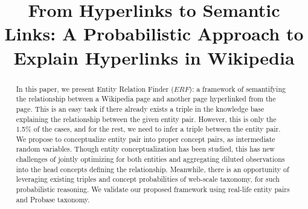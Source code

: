 \documentclass[letterpaper]{article}
\begin{document}
\title{From Hyperlinks to Semantic Links: A Probabilistic Approach to Explain Hyperlinks in Wikipedia}




\maketitle
\begin{abstract}

In this paper, we present Entity Relation Finder ($ERF$): a framework of semantifying 
the relationship between a Wikipedia page and another page hyperlinked from the page.
This is an easy task if there already exists a triple in the knowledge base explaining the relationship
between the given entity pair.
However, this is only the 1.5\% of the cases, and for the rest, we need to infer a triple between the entity pair.
We propose to conceptualize entity pair into proper concept pairs, as intermediate random variables.
Though entity conceptualization has been studied, this has new challenges of jointly optimizing for both entities and aggregating diluted observations into the head concepts defining the relationship.
Meanwhile, there is an opportunity of leveraging existing triples and concept probabilities of web-scale taxonomy, for such probabilistic reasoning.
We validate our proposed framework using real-life entity pairs and Probase taxonomy.

\end{abstract}

\vspace{-2mm}

\vspace{-2mm}

\vspace{-2mm}

\vspace{-2mm}

\vspace{-2mm}

\vspace{-2mm}

%
\vspace{-2mm}

\vspace{-2mm}

\newpage	

\small

%

\end{document}
